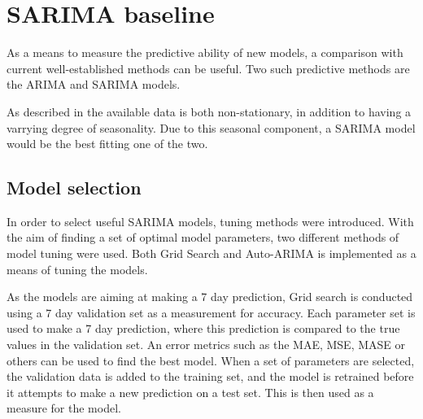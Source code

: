 
\section{SARIMA baseline}
\label{section:Architecture:Baselines:Arima}

\iffalse
This section presents the overarching methods and method architectures used in this thesis.
In an effort to analyze data and make predictions on the problem space, predictive models are applied.
Using well-established methods, we intend to create baseline predictions in order to evaluate a new model.
These baseline methods are presented here.
\fi


As a means to measure the predictive ability of new models, a comparison with current well-established methods can be useful.
Two such predictive methods are the ARIMA and SARIMA models.

As described in  the available data is both non-stationary, in addition to having a varrying degree of seasonality.
Due to this seasonal component, a SARIMA model would be the best fitting one of the two.


\subsection{Model selection}
In order to select useful SARIMA models, tuning methods were introduced.
With the aim of finding a set of optimal model parameters, two different methods of model tuning were used.
Both Grid Search and Auto-ARIMA is implemented as a means of tuning the models.%

As the models are aiming at making a 7 day prediction, Grid search is conducted using a 7 day validation set as a measurement for accuracy.
Each parameter set is used to make a 7 day prediction, where this prediction is compared to the true values in the validation set.
An error metrics such as the MAE, MSE, MASE or others can be used to find the best model.
When a set of parameters are selected, the validation data is added to the training set, and the model is retrained before it attempts to make a new prediction on a test set.
This is then used as a measure for the model.

